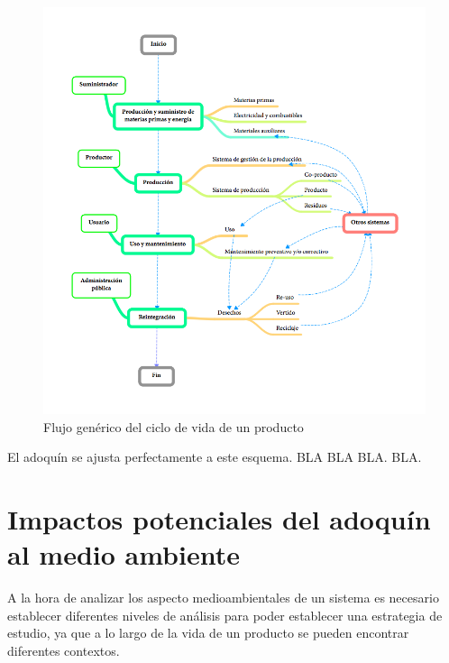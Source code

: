 \begin{figure}[!htb]
\centering
\includegraphics[width=15cm]{flujo_generico_acv.png}
\caption{Flujo genérico del ciclo de vida de un producto}
\label{fig:flujo_generico_acv}
\end{figure}

El adoquín se ajusta perfectamente a este esquema. BLA BLA BLA. BLA.

\section{Impactos potenciales del adoquín al medio ambiente}
A la hora de analizar los aspecto medioambientales de un sistema es necesario establecer diferentes niveles de análisis para poder establecer una estrategia de estudio, ya que a lo largo de la vida de un producto se pueden encontrar diferentes contextos.

